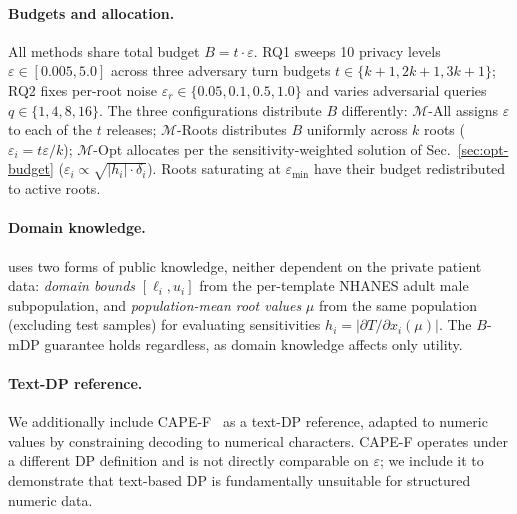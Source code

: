 \paragraph{Budgets and allocation.} All methods share total budget $B = t \cdot \varepsilon$. RQ1 sweeps 10 privacy levels $\varepsilon \in [0.005, 5.0]$ across three adversary turn budgets $t \in \{k{+}1, 2k{+}1, 3k{+}1\}$; RQ2 fixes per-root noise $\varepsilon_r \in \{0.05, 0.1, 0.5, 1.0\}$ and varies adversarial queries $q \in \{1, 4, 8, 16\}$. The three configurations distribute $B$ differently: $\mathcal{M}$-All assigns $\varepsilon$ to each of the $t$ releases; $\mathcal{M}$-Roots distributes $B$ uniformly across $k$ roots ($\varepsilon_i = t\varepsilon/k$); $\mathcal{M}$-Opt allocates per the sensitivity-weighted solution of Sec.~\ref{sec:opt-budget} ($\varepsilon_i \propto \sqrt{|h_i| \cdot \delta_i}$). Roots saturating at $\varepsilon_{\min}$ have their budget redistributed to active roots.

\paragraph{Domain knowledge.} \sysname{} uses two forms of public knowledge, neither dependent on the private patient data: \textit{domain bounds} $[\ell_i, u_i]$ from the per-template NHANES adult male subpopulation, and \textit{population-mean root values} $\mu$ from the same population (excluding test samples) for evaluating sensitivities $h_i = |\partial T / \partial x_i(\mu)|$. The $B$-mDP guarantee holds regardless, as domain knowledge affects only utility.

\paragraph{Text-DP reference.} We additionally include CAPE-F~\cite{wu2025capecontextawarepromptperturbation} as a text-DP reference, adapted to numeric values by constraining decoding to numerical characters. CAPE-F operates under a different DP definition and is not directly comparable on $\varepsilon$; we include it to demonstrate that text-based DP is fundamentally unsuitable for structured numeric data.

 
 
